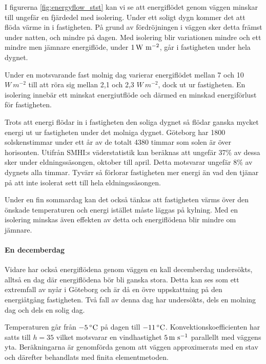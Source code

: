 I figurerna \ref{fig:energyflow_stst} kan vi se att energiflödet genom väggen minskar till 
ungefär en fjärdedel med isolering. Under ett soligt dygn kommer det att flöda värme in i
 fastigheten. På grund av fördröjningen i väggen sker detta främst under natten, 
 och mindre på dagen. Med isolering blir variationen mindre och ett mindre men jämnare 
 energiflöde, under $\unit[1]{W~m^{-2}}$, går i fastigheten under hela dygnet.

Under en motsvarande fast molnig dag varierar energiflödet mellan 7 och 10 
$\unit{W~m^{-2}}$ till att röra sig mellan 2,1 och 2,3 $\unit{W~m^{-2}}$, dock ut ur 
fastigheten. En isolering innebär ett minskat energiutflöde och därmed en minskad 
energiförlust för fastigheten.

Trots att energi flödar in i fastigheten den soliga dygnet så flödar ganska mycket energi 
ut ur fastigheten under det molniga dygnet. Göteborg har 1800 solskenstimmar under ett
 år av de totalt 4380 timmar som solen är över horisonten. Utifrån SMHI:s väderstatistik \cite{SMHIdata}
 kan beräknas att ungefär 37\% av dessa sker under eldningssäsongen, oktober till april. 
 Detta motsvarar ungefär 8\% av dygnets alla timmar. Tyvärr så förlorar fastigheten mer 
 energi än vad den tjänar på att inte isolerat sett till hela eldningssäsongen.

Under en fin sommardag kan det också tänkas att fastigheten värms över den önskade 
temperaturen och energi istället måste läggas på kylning. Med en isolering minskas även 
effekten av detta och energiflödena blir mindre om jämnare.

\paragraph{En decemberdag}

Vidare har också energiflödena genom väggen en kall decemberdag undersökts, 
alltså en dag där energiflödena bör bli ganska stora. Detta kan ses som ett extremfall av
nyår i Göteborg och är då en övre uppskattning på den energiåtgång fastigheten. Två fall av
denna dag har undersökts, dels en molning dag och dels en solig dag.

 Temperaturen går från $\unit[-5]{^\circ C}$ på dagen till $\unit[-11]{^\circ C}$. 
 Konvektionskoefficienten har satts till $h=35$ 
 vilket motsvarar en vindhastighet $\unit[5]{m~s^{-1}}$ parallellt med väggens yta. 
 Beräkningarna är genomförda genom att väggen approximerats med en stav och 
 därefter behandlats med finita elementmetoden.


